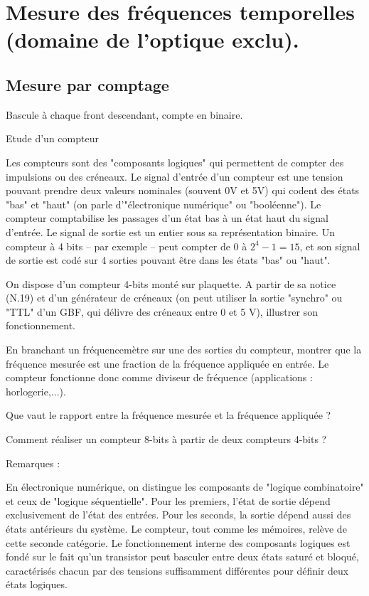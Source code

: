 \documentclass{article}%
\begin{document}
\section{Mesure des fréquences temporelles (domaine de l'optique exclu).}
\subsection{Mesure par comptage}
Bascule à chaque front descendant, compte en binaire.

Etude d'un compteur

Les compteurs sont des "composants logiques" qui permettent de compter des impulsions ou des créneaux. Le signal d'entrée d'un compteur est une tension pouvant prendre deux valeurs nominales (souvent 0V et 5V) qui codent des états "bas" et "haut" (on parle d'"électronique numérique" ou "booléenne"). Le compteur comptabilise les passages d'un état bas à un état haut du signal d'entrée. Le signal de sortie est un entier sous sa représentation binaire. Un compteur à 4 bits -- par exemple -- peut compter de $0$ à $2^{4} - 1 = 15$, et son signal de sortie est codé sur 4 sorties pouvant être dans les états "bas" ou "haut".

On dispose d'un compteur 4-bits monté sur plaquette. A partir de sa notice (N.19) et d'un générateur de créneaux (on peut utiliser la sortie "synchro" ou "TTL" d'un GBF, qui délivre des créneaux entre 0 et 5 V), illustrer son fonctionnement.

En branchant un fréquencemètre sur une des sorties du compteur, montrer que la fréquence mesurée est une fraction de la fréquence appliquée en entrée. Le compteur fonctionne donc comme diviseur de fréquence (applications : horlogerie,...).

Que vaut le rapport entre la fréquence mesurée et la fréquence appliquée ?

Comment réaliser un compteur 8-bits à partir de deux compteurs 4-bits ?

Remarques :

    En électronique numérique, on distingue les composants de "logique combinatoire" et ceux de "logique séquentielle". Pour les premiers, l'état de sortie dépend exclusivement de l'état des entrées. Pour les seconds, la sortie dépend aussi des états antérieurs du système. Le compteur, tout comme les mémoires, relève de cette seconde catégorie.
    Le fonctionnement interne des composants logiques est fondé sur le fait qu'un transistor peut basculer entre deux états saturé et bloqué, caractérisés chacun par des tensions suffisamment différentes pour définir deux états logiques.
\end{document}
